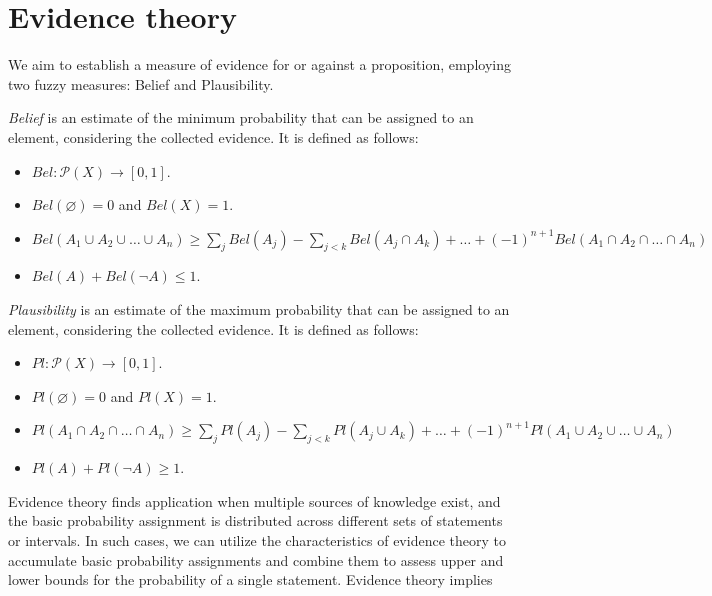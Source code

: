 \documentclass[12pt, a4paper]{report}
\begin{document}
    \section{Evidence theory}
    We aim to establish a measure of evidence for or against a proposition, employing two fuzzy measures: Belief and Plausibility.
    \begin{definition}
        \emph{Belief} is an estimate of the minimum probability that can be assigned to an element, considering the collected evidence. It is defined as follows:
        \begin{itemize}
            \item $Bel:\mathcal{P} (X) \rightarrow [0,1]$.
            \item $Bel(\varnothing)=0$ and $Bel(X)=1$.
            \item $Bel(A_1 \cup A_2 \cup \dots \cup A_n) \geq \sum_{j}Bel(A_j)-\sum_{j<k}Bel(A_j \cap A_k)+\dots+(-1)^{n+1}Bel(A_1 \cap A_2 \cap \dots \cap A_n)$
            \item $Bel(A)+Bel(\lnot A) \leq 1$.
        \end{itemize}

        \emph{Plausibility} is an estimate of the maximum probability that can be assigned to an element, considering the collected evidence. It is defined as follows:
        \begin{itemize}
            \item $Pl:\mathcal{P} (X) \rightarrow [0,1]$.
            \item $Pl(\varnothing)=0$ and $Pl(X)=1$.
            \item $Pl(A_1 \cap A_2 \cap \dots \cap A_n) \geq \sum_{j}Pl(A_j)-\sum_{j<k}Pl(A_j \cup A_k)+\dots+(-1)^{n+1}Pl(A_1 \cup A_2 \cup \dots \cup A_n)$
            \item $Pl(A)+Pl(\lnot A) \geq 1$.
        \end{itemize}
    \end{definition}
    Evidence theory finds application when multiple sources of knowledge exist, and the basic probability assignment is distributed across different sets of statements or intervals. 
    In such cases, we can utilize the characteristics of evidence theory to accumulate basic probability assignments and combine them to assess upper and lower bounds for the probability of a single statement. 
    Evidence theory implies
\end{document}
